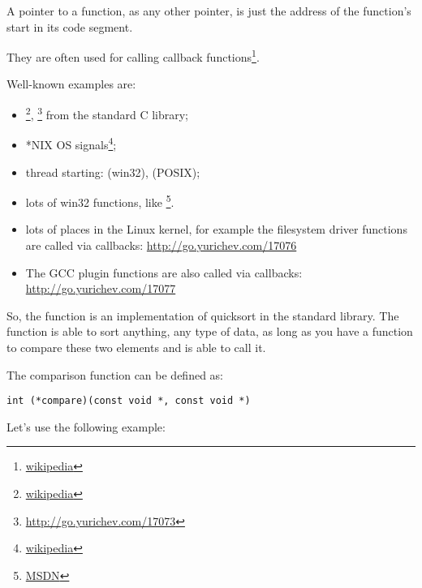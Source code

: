 \newcommand{\comp}{\TT{comp()}\xspace}
\label{sec:pointerstofunctions}

\myindex{\CLanguageElements!\Pointers}

A pointer to a function, as any other pointer, is just the address of the function's start in its code segment.

They are often used for calling callback functions\footnote{\href{http://go.yurichev.com/17071}{wikipedia}}.

Well-known examples are:

\begin{itemize}
\item \qsort\footnote{\href{http://go.yurichev.com/17072}{wikipedia}},
{}\footnote{\url{http://go.yurichev.com/17073}} from the standard C library; 

\item *NIX OS signals\footnote{\href{http://go.yurichev.com/17074}{wikipedia}};

\item thread starting:  (win32),  (POSIX);

\item lots of win32 functions, like \footnote{\href{http://go.yurichev.com/17075}{MSDN}}.

\item lots of places in the Linux kernel, for example the filesystem driver functions are called via callbacks: 
\url{http://go.yurichev.com/17076}

\item The GCC plugin functions are also called via callbacks: 
\url{http://go.yurichev.com/17077}
\end{itemize}


So, the \qsort function is an implementation of quicksort in the \CCpp standard library. 
The function is able to sort anything, any type of data, as long as you have a function to compare these two elements 
and \qsort is able to call it.

The comparison function can be defined as:

\begin{lstlisting}
int (*compare)(const void *, const void *)
\end{lstlisting}

Let's use the following example:

